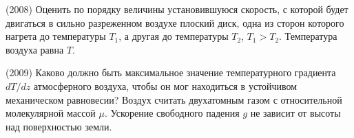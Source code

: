 \begin{ex}
(2008) Оценить по порядку величины установившуюся скорость, с которой будет двигаться в сильно разреженном воздухе плоский диск, одна из сторон которого нагрета до температуры $T_1$, а другая до температуры $T_2$, $T_1>T_2$. Температура воздуха равна $T$.
\begin{ans}
\end{ans}
\end{ex}

\begin{ex}
(2009) Каково должно быть максимальное значение температурного градиента $dT/dz$ атмосферного воздуха, 
чтобы он мог находиться в устойчивом механическом равновесии? Воздух считать двухатомным газом с относительной молекулярной массой $\mu$. 
Ускорение свободного падения $g$ не зависит от высоты над поверхностью земли.
\begin{ans}
\end{ans}
\end{ex}